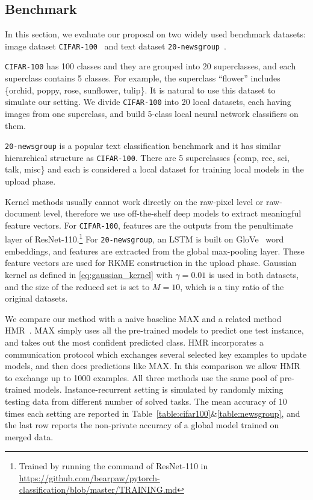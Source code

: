 \documentclass[paper=letter, fontsize=20pt]{article}
\begin{document}
\subsection{Benchmark} \label{sec:benchmark}
In this section, we evaluate our proposal on two widely used benchmark datasets: image dataset \texttt{CIFAR-100}~\citep{cifar100} and text dataset \texttt{20-newsgroup}~\citep{20newsgroup}. 

\texttt{CIFAR-100} has 100 classes and they are grouped into 20 superclasses, and each superclass contains 5 classes. For example, the superclass ``flower'' includes \{orchid, poppy, rose, sunflower, tulip\}. It is natural to use this dataset to simulate our setting. We divide \texttt{CIFAR-100} into 20 local datasets, each having images from one superclass, and build 5-class local neural network classifiers on them.

\texttt{20-newsgroup} is a popular text classification benchmark and it has similar hierarchical structure as \texttt{CIFAR-100}. There are 5 superclasses \{comp, rec, sci, talk, misc\} and each is considered a local dataset for training local models in the upload phase.

Kernel methods usually cannot work directly on the raw-pixel level or raw-document level, therefore we use off-the-shelf deep models to extract meaningful feature vectors. For \texttt{CIFAR-100}, features are the outputs from the penultimate layer of ResNet-110.\footnote{Trained by running the command of ResNet-110 in \url{https://github.com/bearpaw/pytorch-classification/blob/master/TRAINING.md}} For \texttt{20-newsgroup}, an LSTM is built on GloVe~\citep{glove} word embeddings, and features are extracted from the global max-pooling layer. These feature vectors are used for RKME construction in the upload phase. Gaussian kernel as defined in \eqref{eq:gaussian_kernel} with $\gamma=0.01$ is used in both datasets, and the size of the reduced set is set to $M=10$, which is a tiny ratio of the original datasets.

We compare our method with a naive baseline MAX and a related method HMR~\citep{HMR}. MAX simply uses all the pre-trained models to predict one test instance, and takes out the most confident predicted class. HMR incorporates a communication protocol which exchanges several selected key examples to update models, and then does predictions like MAX. In this comparison we allow HMR to exchange up to 1000 examples. All three methods use the same pool of pre-trained models. Instance-recurrent setting is simulated by randomly mixing testing data from different number of solved tasks. The mean accuracy of 10 times each setting are reported in Table~\ref{table:cifar100}\&\ref{table:newsgroup}, and the last row reports the non-private accuracy of a global model trained on merged data.
\end{document}
